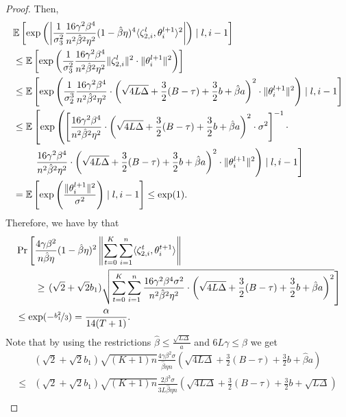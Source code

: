 \documentclass[a4paper,11pt]{article}
\begin{document}
\begin{proof}
    Then,
    \begin{align*}
    &\E{\exp\left(\left|\frac{1}{\sigma_3^2}\frac{16\gamma^2\beta^4}{n^2\hat{\beta}^2\eta^2}(1-\hat{\beta}\eta)^4\<\zeta^l_{2,i},\theta^{l+1}_i>^2\right|\right) \mid l,i-1} \\
    &\le 
    \E{\exp\left(\frac{1}{\sigma_3^2}\frac{16\gamma^2\beta^4}{n^2\hat{\beta}^2\eta^2}\|\zeta_{2,i}^l\|^2 \cdot \|\theta^{l+1}_i\|^2\right)}\\
    &\le \E{\exp\left(\frac{1}{\sigma^3_2}\frac{16\gamma^2\beta^4}{n^2\hat{\beta}^2\eta^2}\cdot \left(\sqrt{4L\Delta} + \frac{3}{2}(B-\tau) + \frac{3}{2}b + \hat{\beta}a\right)^2\cdot \|\theta_i^{l+1}\|^2\right)\mid l,i-1}\\
    &\le \mathbb{E}\left[\exp\left(\left[\frac{16\gamma^2\beta^4}{n^2\hat{\beta}^2\eta^2}\cdot \left(\sqrt{4L\Delta} + \frac{3}{2}(B-\tau) + \frac{3}{2}b + \hat{\beta}a\right)^2\cdot \sigma^2\right]^{-1}\cdot\right.\right.\\
    &\qquad \left.\left.\frac{16\gamma^2\beta^4}{n^2\hat{\beta}^2\eta^2}\cdot \left(\sqrt{4L\Delta} + \frac{3}{2}(B-\tau) + \frac{3}{2}b + \hat{\beta}a\right)^2\cdot \|\theta_i^{l+1}\|^2\right)\mid l,i-1\right]\\
    &= \E{\exp\left(\frac{\|\theta^{l+1}_i\|^2}{\sigma^2}\right)\mid l,i-1} \le \exp(1).
    \end{align*}
    Therefore, we have by  that 
    \begin{align*}
    &\Pr\left[\frac{4\gamma\beta^2}{n\hat{\beta}\eta}(1-\hat{\beta}\eta)^2\left\|\sum_{t=0}^K\sum_{i=1}^n\<\zeta_{2,i}^t,\theta^{t+1}_i>\right\| \right.\\
    &\qquad\ge  \left.(\sqrt{2}+\sqrt{2}b_1)\sqrt{\sum_{t=0}^K\sum_{i=1}^n \frac{16\gamma^2\beta^4\sigma^2}{n^2\hat{\beta}^2\eta^2}\cdot \left(\sqrt{4L\Delta}+ \frac{3}{2}(B-\tau) + \frac{3}{2}b + \hat{\beta}a\right)^2}\right]\\ 
    &\le \exp(-\nicefrac{b_1^2}{3}) = \frac{\alpha}{14(T+1)}.
    \end{align*}
    Note that by using the restrictions $\hat{\beta} \le \frac{\sqrt{L\Delta}}{a}$ and $6L\gamma \le \beta$ we get
    \begin{align*}
    & (\sqrt{2}+\sqrt{2}b_1)\sqrt{(K+1)n}\frac{4\gamma\beta^2\sigma}{\hat{\beta}\eta n}\left(\sqrt{4L\Delta}+ \frac{3}{2}(B-\tau) + \frac{3}{2}b+ \hat{\beta}a\right)\\
    \le & (\sqrt{2}+\sqrt{2}b_1)\sqrt{(K+1)n}\frac{2\beta^{3}\sigma}{3L\hat{\beta}\eta n}\left(\sqrt{4L\Delta}+ \frac{3}{2}(B-\tau) + \frac{3}{2}b + \sqrt{L\Delta}\right)\\

\end{align*}
\end{proof}
\end{document}
